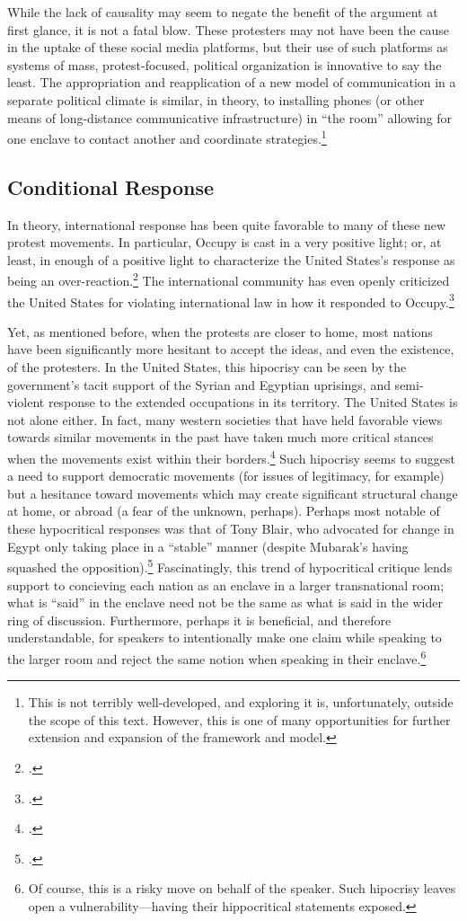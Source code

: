 \documentclass[openany,twoside]{memoir}
\begin{document}
\begin{Spacing}{2}
While the lack of causality may seem to negate the benefit of the argument at first glance, it is not a fatal blow.
These protesters may not have been the cause in the uptake of these social media platforms, but their use of such platforms as systems of mass, protest-focused, political organization is innovative to say the least.
The appropriation and reapplication of a new model of communication in a separate political climate is similar, in theory, to installing phones (or other means of long-distance communicative infrastructure) in ``the room'' allowing for one enclave to contact another and coordinate strategies.\footnote{
This is not terribly well-developed, and exploring it is, unfortunately, outside the scope of this text.
However, this is one of many opportunities for further extension and expansion of the framework and model.}

\subsection{Conditional Response}
In theory, international response has been quite favorable to many of these new protest movements.
In particular, Occupy is cast in a very positive light; or, at least, in enough of a positive light to characterize the United States's response as being an over-reaction.\footcite{knuckey12}
The international community has even openly criticized the United States for violating international law in how it responded to Occupy.\footcite{harvardhr12}

Yet, as mentioned before, when the protests are closer to home, most nations have been significantly more hesitant to accept the ideas, and even the existence, of the protesters.
In the United States, this hipocrisy can be seen by the government's tacit support of the Syrian and Egyptian uprisings, and semi-violent response to the extended occupations in its territory.
The United States is not alone either.
In fact, many western societies that have held favorable views towards similar movements in the past have taken much more critical stances when the movements exist within their borders.\footcite{zizek11}
Such hipocrisy seems to suggest a need to support democratic movements (for issues of legitimacy, for example) but a hesitance toward movements which may create significant structural change at home, or abroad (a fear of the unknown, perhaps).
Perhaps most notable of these hypocritical responses was that of Tony Blair, who advocated for change in Egypt only taking place in a ``stable'' manner (despite Mubarak's having squashed the opposition).\footcite{zizek11}
Fascinatingly, this trend of hypocritical critique lends support to concieving each nation as an enclave in a larger transnational room; what is ``said'' in the enclave need not be the same as what is said in the wider ring of discussion.
Furthermore, perhaps it is beneficial, and therefore understandable, for speakers to intentionally make one claim while speaking to the larger room and reject the same notion when speaking in their enclave.\footnote{
Of course, this is a risky move on behalf of the speaker.
Such hipocrisy leaves open a vulnerability---having their hippocritical statements exposed.}


\end{Spacing}
\end{document}
